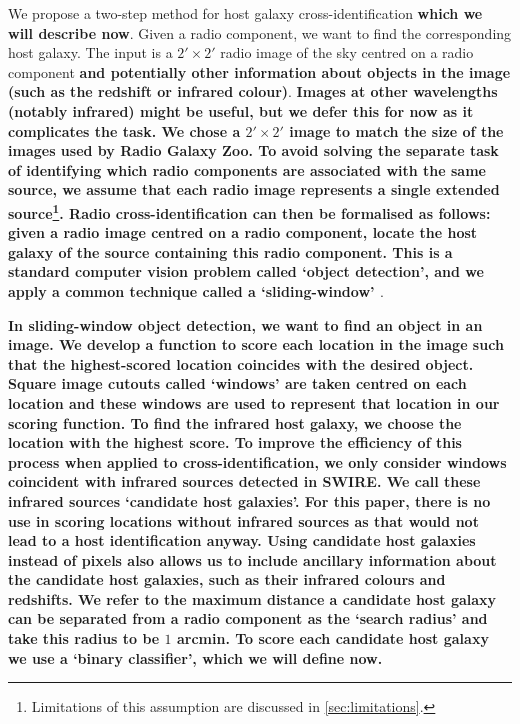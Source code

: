 \documentclass[fleqn,usenatbib,usedcolumn]{mnras}
\newcommand{\edited}[1]{{\bf {#1}}}
\begin{document}
    We propose a two-step method for host galaxy cross-identification
    \edited{which we will describe now}. Given a radio component, we want to find
    the corresponding host galaxy. The input is a $2' \times
    2'$ radio image of
    the sky centred on a radio component \edited{and potentially other information about
    objects in the image (such as the redshift or infrared colour)}. \edited{Images at other wavelengths (notably infrared) might be
    useful, but we defer this for now as it complicates the task.
    \edited{We chose a $2' \times 2'$ image to match} the size of the images used
    by Radio Galaxy Zoo. To avoid solving the separate task of identifying
    which radio components are associated with the same source, we assume
    that each radio image represents a single extended
    source\footnote{Limitations of this assumption are discussed in
    \autoref{sec:limitations}.}. Radio cross-identification can then
    be formalised as follows: given a radio image centred on a radio
    component, locate the host galaxy of the source containing this radio
    component. This is a standard computer vision problem called `object
    detection', and we apply a common technique called a `sliding-window'
    \citep{rowley1996facedetection}}.

    \edited{In sliding-window object detection, we want to find an object in an image.
    We develop a function to score each location in the image such that the
    highest-scored location coincides with the desired object. Square image
    cutouts called `windows' are taken centred on each location and these
    windows are used to represent that location in our scoring function. To
    find the infrared host galaxy, we choose the location with the highest
    score. To improve the efficiency of this process when applied to
    cross-identification, we only consider windows coincident with infrared
    sources detected in SWIRE. We call these infrared sources `candidate
    host galaxies'. For this paper, there is no use in scoring
    locations without infrared sources as that would not lead to a host identification
    anyway. Using candidate host galaxies instead of pixels also
    allows us to include ancillary information about the candidate host
    galaxies, such as their infrared colours and redshifts. We refer to the
    maximum distance a candidate host galaxy can be separated from a radio component as
    the `search radius' and take this radius to be $1$ arcmin. To score each
    candidate host galaxy we use a `binary classifier', which we will define
    now.}
\end{document}
